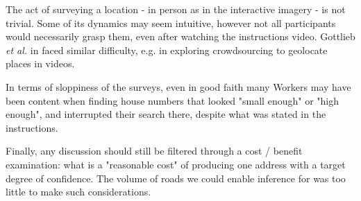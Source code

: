 The act of surveying a location - in person as in the interactive imagery - is not trivial. Some of its dynamics may seem intuitive, however not all participants would necessarily grasp them, even after watching the instructions video. Gottlieb {\it et al.} in \cite{Gottlieb:2012fh} faced similar difficulty, e.g. in exploring crowdsourcing to geolocate places in videos.

In terms of sloppiness of the surveys, even in good faith many Workers may have been content when finding house numbers that looked "small enough" or "high enough", and interrupted their search there, despite what was stated in the instructions. 

Finally, any discussion should still be filtered through a cost / benefit examination: what is a "reasonable cost" of producing one address with a target degree of confidence. The volume of roads we could enable inference for was too little to make such considerations.
